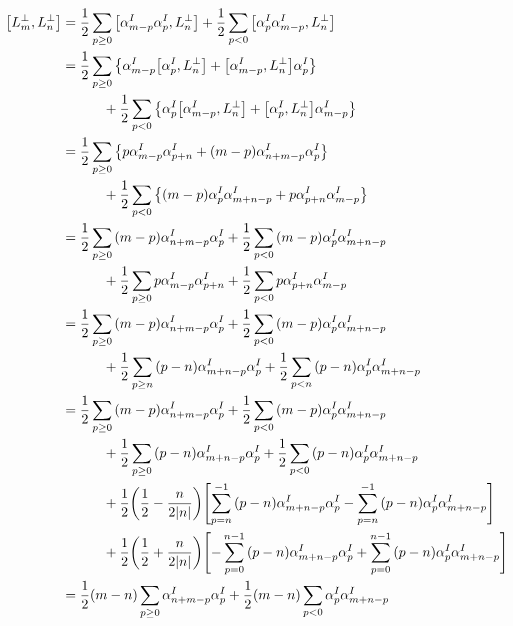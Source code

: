 \begin{align*}
    \comm{L_m^\perp}{L_n^\perp}&=\frac12\sum\limits_{p\geq 0}\comm{\alpha_{m-p}^I\alpha_{p}^I}{L^\perp_n}+\frac12\sum\limits_{p< 0}\comm{\alpha_{p}^I\alpha_{m-p}^I}{L^\perp_n}\\
    &=\frac12\sum\limits_{p\geq 0}\qty{\alpha_{m-p}^I\comm{\alpha_{p}^I}{L^\perp_n}+\comm{\alpha_{m-p}^I}{L^\perp_n}\alpha_{p}^I}\\
    &\quad\quad\quad+\frac12\sum\limits_{p< 0}\qty{\alpha_{p}^I\comm{\alpha_{m-p}^I}{L^\perp_n}+\comm{\alpha_{p}^I}{L^\perp_n}\alpha_{m-p}^I}\\
    &=\frac12\sum\limits_{p\geq 0}\qty{p\alpha_{m-p}^I\alpha_{p+n}^I+\qty(m-p)\alpha_{n+m-p}^I\alpha_{p}^I}\\
    &\quad\quad\quad+\frac12\sum\limits_{p< 0}\qty{\qty(m-p)\alpha_{p}^I\alpha_{m+n-p}^I+p\alpha_{p+n}^I\alpha_{m-p}^I}\\
    &=\frac12\sum\limits_{p\geq 0}\qty(m-p)\alpha_{n+m-p}^I\alpha_{p}^I+\frac12\sum\limits_{p< 0}\qty(m-p)\alpha_{p}^I\alpha_{m+n-p}^I\\
    &\quad\quad\quad+\frac12\sum\limits_{p\geq 0}p\alpha_{m-p}^I\alpha_{p+n}^I+\frac12\sum\limits_{p< 0}p\alpha_{p+n}^I\alpha_{m-p}^I\\
    &=\frac12\sum\limits_{p\geq 0}\qty(m-p)\alpha_{n+m-p}^I\alpha_{p}^I+\frac12\sum\limits_{p< 0}\qty(m-p)\alpha_{p}^I\alpha_{m+n-p}^I\\
    &\quad\quad\quad+\frac12\sum\limits_{p\geq n}\qty(p-n)\alpha_{m+n-p}^I\alpha_{p}^I+\frac12\sum\limits_{p< n}\qty(p-n)\alpha_{p}^I\alpha_{m+n-p}^I\\
    &=\frac12\sum\limits_{p\geq 0}\qty(m-p)\alpha_{n+m-p}^I\alpha_{p}^I+\frac12\sum\limits_{p< 0}\qty(m-p)\alpha_{p}^I\alpha_{m+n-p}^I\\
    &\quad\quad\quad+\frac12\sum\limits_{p\geq 0}\qty(p-n)\alpha_{m+n-p}^I\alpha_{p}^I+\frac12\sum\limits_{p< 0}\qty(p-n)\alpha_{p}^I\alpha_{m+n-p}^I\\
    &\quad\quad\quad+\frac12\qty(\frac12-\frac{n}{2\abs{n}})\qty[\sum\limits_{p= n}^{-1}\qty(p-n)\alpha_{m+n-p}^I\alpha_{p}^I-\sum\limits_{p= n}^{-1}\qty(p-n)\alpha_{p}^I\alpha_{m+n-p}^I]\\
    &\quad\quad\quad+\frac12\qty(\frac12+\frac{n}{2\abs{n}})\qty[-\sum\limits_{p= 0}^{n-1}\qty(p-n)\alpha_{m+n-p}^I\alpha_{p}^I+\sum\limits_{p= 0}^{n-1}\qty(p-n)\alpha_{p}^I\alpha_{m+n-p}^I]\\
    &=\frac12\qty(m-n)\sum\limits_{p\geq 0}\alpha_{n+m-p}^I\alpha_{p}^I+\frac12\qty(m-n)\sum\limits_{p< 0}\alpha_{p}^I\alpha_{m+n-p}^I\\

\end{align*}
